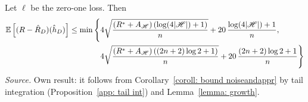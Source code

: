\documentclass[reqno]{amsart}
\begin{document}
\begin{theorem}\label{thm: bound noiseandappr}
  Let $\ell$ be the zero-one loss. Then
\begin{equation*}
\begin{split}
\mathbb{E}\left[(R-\hat R_D)(\hat h_D)\right] \le \min\Bigg\{ &4\sqrt{\frac{(R^*+A_{\mathscr{H}})\left(\log (4\vert\mathscr{H}\vert)+1\right)}{n}} + 20\,\frac{\log(4\vert\mathscr{H}\vert)+1}{n}, \\
&4\sqrt{\frac{(R^*+A_{\mathscr{H}})\left((2n+2)\log 2+1\right)}{n}} + 20\,\frac{(2n+2)\log 2+1}{n} \Bigg\}
\end{split}
\end{equation*}
\textnormal{\emph{Source.} Own result: it follows from Corollary~\ref{coroll: bound noiseandappr} by tail integration (Proposition~\ref{app: tail int}) and Lemma~\ref{lemma: growth}.}


\end{theorem}
\end{document}
